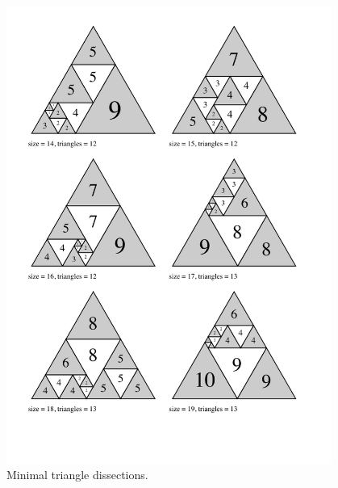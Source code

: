 \begin{figure}[htb]
\centering
\includegraphics[trim=2em 4em 3em 2em, width=0.95\textwidth]{img/tranquility3.pdf}
\caption{Minimal triangle dissections.}
\end{figure}

